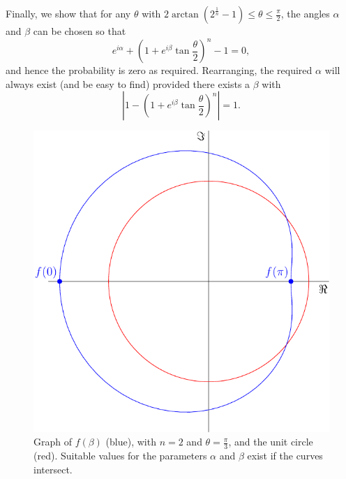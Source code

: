 \documentclass[amsmath,amssymb,superscriptaddress,twocolumn,pra]{revtex4-1}
\newcommand{\abs}[1]{\left\lvert{#1}\right\rvert}
\begin{document}
Finally, we show that for any $\theta$ with $2\arctan\left(2^\frac{1}{n} - 1\right) \leq \theta \leq \frac\pi2$, the angles $\alpha$ and $\beta$ can be chosen so that
\begin{equation}
e^{i\alpha} + \left(1+e^{i\beta}\tan\frac\theta2\right)^n - 1 = 0,
\end{equation}
and hence the probability is zero as required.
Rearranging, the required $\alpha$ will always exist (and be easy to find) provided there exists a $\beta$ with
\begin{equation}
  \abs{1 - \left(1+e^{i\beta}\tan\frac\theta2\right)^n} = 1.\label{betaeq}
\end{equation}
\begin{figure}
  \begin{center}
\includegraphics[scale=0.7]{figs/curve}
  \end{center}
  \caption{Graph of $f(\beta)$ (blue), with $n=2$ and $\theta=\frac\pi3$, and the unit circle (red). Suitable values for the parameters $\alpha$ and $\beta$ exist if the curves intersect.}
  \label{curve}
\end{figure}
\end{document}
